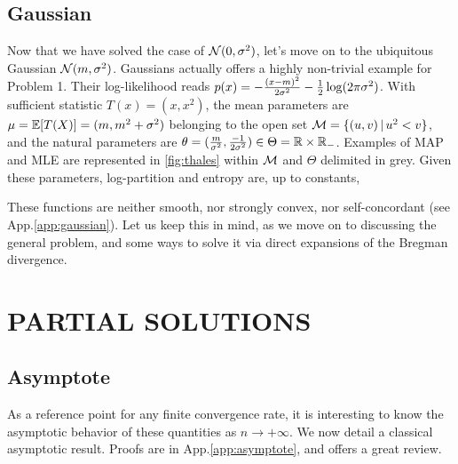 \documentclass[twoside]{article}
\let\oldsection\section
\renewcommand{\section}[1]{\oldsection{\texorpdfstring{\uppercase{#1}}{#1}}}
\newcommand{\cond}{\,\vert\,}
\newcommand{\logpart}{A}
\newcommand{\conj}{\logpart^*}
\newcommand{\nat}{\theta}
\newcommand{\m}{\mu}
\begin{document}
\subsection{Gaussian}
\label{ssec:gaussian}
Now that we have solved the case of ${\mathcal N}(0,\sigma^2)$, let's move on to the ubiquitous Gaussian ${\mathcal N}(m,\sigma^2)$.
Gaussians actually offers a highly non-trivial example for Problem 1.
Their log-likelihood reads $p(x) = -\frac{(x-m)^2}{2 \sigma^2} - \frac{1}{2} \log(2\pi\sigma^2)$.
With sufficient statistic $T(x)=(x, x^2)$, 
the mean parameters are $\m = \E[T(X)] = (m , m^2 + \sigma^2)$ belonging to the open set $\cM= \{(u,v) \cond u^2 < v\}$,
and the natural parameters are $\nat= (\frac{m}{\sigma^2} , \frac{-1}{2\sigma^2}) \in \Theta = \real \times \real_-$. 
Examples of MAP and MLE  are represented in \cref{fig:thales} within ${\mathcal M}$ and $\Theta$ delimited in grey.
Given these parameters, log-partition and entropy are, up to constants, 
\alignn{
	\logpart(\nat) &= \frac{\nat_1^2}{-4\nat_2} - \half \log(-2\nat_2) \\
	\conj(\m) &= - \half \log (\mu_2 - \mu_1^2)
}

These functions are neither smooth, nor strongly convex, nor self-concordant (see App.\ref{app:gaussian}).
Let us keep this in mind, as we move on to discussing the general problem, and some ways to solve it via direct expansions of the Bregman divergence.

\section{Partial Solutions}
\label{sec:insights}

\subsection{Asymptote}
\label{ssec:asymptote}
As a reference point for any finite convergence rate, it is interesting to know the asymptotic behavior of these quantities as $n \rightarrow +\infty$.
We now detail a classical asymptotic result.
Proofs are in App.\ref{app:asymptote}, and \citet[\S1.1]{ostrovskii2021finite} offers a great review.
\end{document}
